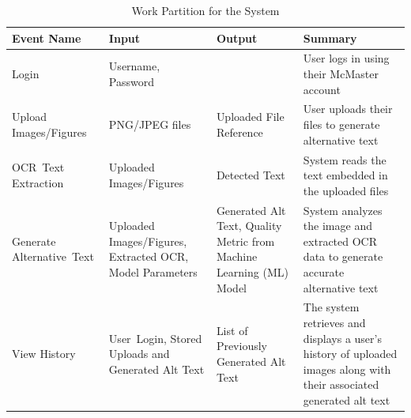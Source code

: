 \documentclass[12pt]{article}
\begin{document}
\begin{table}[H]
  \centering
  \caption{Work Partition for the System}
  \label{tab:work-partition}
  \begin{tabular}{ |p{3cm}|p{3cm}|p{3cm}|p{4cm}| }
    \hline
    \textbf{Event Name} & \textbf{Input} & \textbf{Output} & \textbf{Summary} \\
    \hline
    Login & Username, Password &  & User logs in using their McMaster account \\
    \hline
    Upload \mbox{Images/Figures} & PNG/JPEG files & Uploaded File
    Reference & User uploads their files to generate alternative text \\
    \hline
    \mbox{OCR Text} \mbox{Extraction} & Uploaded
    \mbox{Images/Figures} & Detected Text & System reads the text
    embedded in the uploaded files \\
    \hline
    Generate \mbox{Alternative Text} & Uploaded
    \mbox{Images/Figures}, Extracted OCR, Model Parameters &
    Generated Alt Text, Quality Metric from Machine Learning (ML)
    Model & System analyzes the image and extracted OCR data to
    generate accurate alternative text \\
    \hline
    View History & \mbox{User Login,} Stored Uploads and Generated
    Alt Text & List of Previously Generated Alt Text & The system
    retrieves and displays a user’s history of uploaded images along
    with their associated generated alt text \\
    \hline
  \end{tabular}
\end{table}
\end{document}
